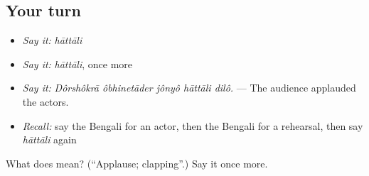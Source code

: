 \subsection*{Your turn}
\begin{itemize}
\raggedright
  \item \emph{Say it:} \emph{hāttāli}
  \item \emph{Say it:} \emph{hāttāli}, once more
  \item \emph{Say it:} \emph{Dôrshôkrā ôbhinetāder jônyô hāttāli dilô.} — The audience applauded the actors.
  \item \emph{Recall:} say the Bengali for an actor, then the Bengali for a rehearsal, then say \emph{hāttāli} again
\end{itemize}

\begin{tcolorbox}[breakable,colback=teal!4,colframe=teal!35!black,title={Before you move on}]
What does  mean? (\textquotedblleft{}Applause; clapping\textquotedblright{}.) Say it once more.
\end{tcolorbox}
